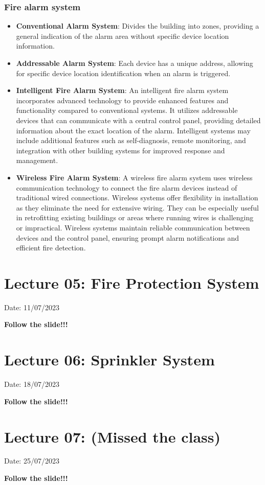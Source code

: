 \documentclass{article}
\begin{document}
\subsubsection*{Fire alarm system} 
\begin{itemize}
  \item \textbf{Conventional Alarm System}: Divides the building into zones, providing a general indication of the alarm area without specific device location information.

  \item \textbf{Addressable Alarm System}: Each device has a unique address, allowing for specific device location identification when an alarm is triggered.

  \item \textbf{Intelligent Fire Alarm System}: An intelligent fire alarm system incorporates advanced technology to provide enhanced features and functionality compared to conventional systems. It utilizes addressable devices that can communicate with a central control panel, providing detailed information about the exact location of the alarm. Intelligent systems may include additional features such as self-diagnosis, remote monitoring, and integration with other building systems for improved response and management.

  \item \textbf{Wireless Fire Alarm System}: A wireless fire alarm system uses wireless communication technology to connect the fire alarm devices instead of traditional wired connections. Wireless systems offer flexibility in installation as they eliminate the need for extensive wiring. They can be especially useful in retrofitting existing buildings or areas where running wires is challenging or impractical. Wireless systems maintain reliable communication between devices and the control panel, ensuring prompt alarm notifications and efficient fire detection.
\end{itemize}

\section{Lecture 05: Fire Protection System} 
\hfill Date: 11/07/2023

\textbf{Follow the slide!!!}
\vspace*{1cm}

\section{Lecture 06: Sprinkler System} 
\hfill Date: 18/07/2023

\textbf{Follow the slide!!!}
\vspace*{1cm}

\section{Lecture 07: (Missed the class)} 
\hfill Date: 25/07/2023

\textbf{Follow the slide!!!}
\vspace*{1cm}
\end{document}
